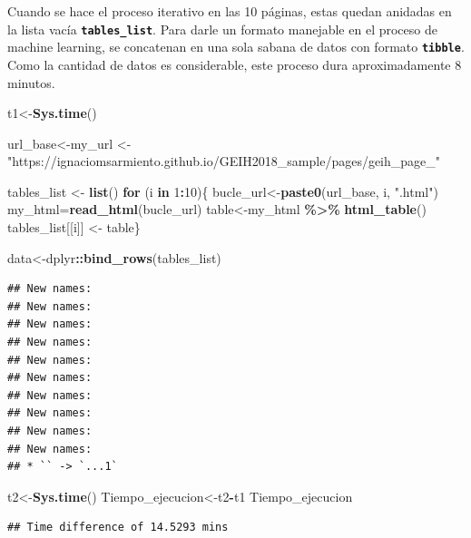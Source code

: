 \documentclass[
]{article}
\newenvironment{Shaded}{\begin{snugshade}}{\end{snugshade}}
\newcommand{\ControlFlowTok}[1]{\textcolor[rgb]{0.13,0.29,0.53}{\textbf{#1}}}
\newcommand{\DecValTok}[1]{\textcolor[rgb]{0.00,0.00,0.81}{#1}}
\newcommand{\FunctionTok}[1]{\textcolor[rgb]{0.13,0.29,0.53}{\textbf{#1}}}
\newcommand{\NormalTok}[1]{#1}
\newcommand{\OtherTok}[1]{\textcolor[rgb]{0.56,0.35,0.01}{#1}}
\newcommand{\SpecialCharTok}[1]{\textcolor[rgb]{0.81,0.36,0.00}{\textbf{#1}}}
\newcommand{\StringTok}[1]{\textcolor[rgb]{0.31,0.60,0.02}{#1}}
\begin{document}
Cuando se hace el proceso iterativo en las 10 páginas, estas quedan
anidadas en la lista vacía \textbf{\texttt{tables\_list}}. Para darle un
formato manejable en el proceso de machine learning, se concatenan en
una sola sabana de datos con formato \textbf{\texttt{tibble}}. Como la
cantidad de datos es considerable, este proceso dura aproximadamente 8
minutos.

\begin{Shaded}
\begin{Highlighting}[]
\NormalTok{t1}\OtherTok{\textless{}{-}}\FunctionTok{Sys.time}\NormalTok{()}

\NormalTok{url\_base}\OtherTok{\textless{}{-}}\NormalTok{my\_url }\OtherTok{\textless{}{-}} \StringTok{"https://ignaciomsarmiento.github.io/GEIH2018\_sample/pages/geih\_page\_"}

\NormalTok{tables\_list }\OtherTok{\textless{}{-}} \FunctionTok{list}\NormalTok{()}
\ControlFlowTok{for}\NormalTok{ (i }\ControlFlowTok{in} \DecValTok{1}\SpecialCharTok{:}\DecValTok{10}\NormalTok{)\{}
\NormalTok{ bucle\_url}\OtherTok{\textless{}{-}}\FunctionTok{paste0}\NormalTok{(url\_base, i, }\StringTok{".html"}\NormalTok{)}
\NormalTok{ my\_html}\OtherTok{=}\FunctionTok{read\_html}\NormalTok{(bucle\_url)}
\NormalTok{ table}\OtherTok{\textless{}{-}}\NormalTok{my\_html }\SpecialCharTok{\%\textgreater{}\%} \FunctionTok{html\_table}\NormalTok{()}
\NormalTok{ tables\_list[[i]] }\OtherTok{\textless{}{-}}\NormalTok{ table\}}

\NormalTok{data}\OtherTok{\textless{}{-}}\NormalTok{dplyr}\SpecialCharTok{::}\FunctionTok{bind\_rows}\NormalTok{(tables\_list)}
\end{Highlighting}
\end{Shaded}

\begin{verbatim}
## New names:
## New names:
## New names:
## New names:
## New names:
## New names:
## New names:
## New names:
## New names:
## New names:
## * `` -> `...1`
\end{verbatim}

\begin{Shaded}
\begin{Highlighting}[]
\NormalTok{t2}\OtherTok{\textless{}{-}}\FunctionTok{Sys.time}\NormalTok{()}
\NormalTok{Tiempo\_ejecucion}\OtherTok{\textless{}{-}}\NormalTok{t2}\SpecialCharTok{{-}}\NormalTok{t1}
\NormalTok{Tiempo\_ejecucion}
\end{Highlighting}
\end{Shaded}

\begin{verbatim}
## Time difference of 14.5293 mins
\end{verbatim}
\end{document}
